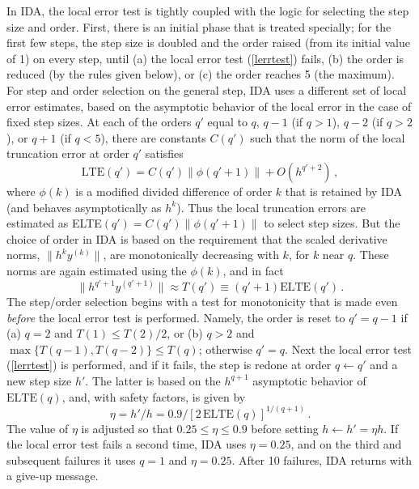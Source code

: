 In IDA, the local error test is tightly coupled with the logic for
selecting the step size and order.  First, there is an initial phase
that is treated specially; for the first few steps, the step size is
doubled and the order raised (from its initial value of 1) on every
step, until (a) the local error test (\ref{lerrtest}) fails, (b) the
order is reduced (by the rules given below), or (c) the order reaches
5 (the maximum).  For step and order selection on the general step,
IDA uses a different set of local error estimates, based on the
asymptotic behavior of the local error in the case of fixed step sizes.
At each of the orders $q'$ equal to $q$, $q-1$ (if $q > 1$), $q-2$ (if
$q > 2$), or $q+1$ (if $q < 5$), there are constants $C(q')$ such that
the norm of the local truncation error at order $q'$ satisfies
\[ \mbox{LTE}(q') = C(q') \| \phi(q'+1) \| + O(h^{q'+2}) \, , \]
where $\phi(k)$ is a modified divided difference of order $k$ that is
retained by IDA (and behaves asymptotically as $h^k$).
Thus the local truncation errors are estimated as
ELTE$(q') = C(q')\|\phi(q'+1)\|$ to select step sizes.  But the choice
of order in IDA is based on the requirement that the scaled derivative
norms, $\|h^k y^{(k)}\|$, are monotonically decreasing with $k$, for
$k$ near $q$.  These norms are again estimated using the $\phi(k)$,
and in fact
\[ \|h^{q'+1} y^{(q'+1)}\| \approx T(q') \equiv (q'+1) \mbox{ELTE}(q') \, . \]
The step/order selection begins with a test for monotonicity that is
made even {\em before} the local error test is performed.  Namely,
the order is reset to $q' = q-1$ if (a) $q=2$ and $T(1)\leq T(2)/2$,
or (b) $q > 2$ and $\max\{T(q-1),T(q-2)\} \leq T(q)$; otherwise 
$q' = q$.  Next the local error test (\ref{lerrtest}) is performed,
and if it fails, the step is redone at order $q\leftarrow q'$ and a
new step size $h'$.  The latter is based on the $h^{q+1}$ asymptotic
behavior of $\mbox{ELTE}(q)$, and, with safety factors, is given by
\[ \eta = h'/h = 0.9/[2 \, \mbox{ELTE}(q)]^{1/(q+1)} \, . \]
The value of $\eta$ is adjusted so that $0.25 \leq \eta \leq 0.9$
before setting $h \leftarrow h' = \eta h$.  If the local error test
fails a second time, IDA uses $\eta = 0.25$, and on the third
and subsequent failures it uses $q = 1$ and $\eta = 0.25$.  After
10 failures, IDA returns with a give-up message.


